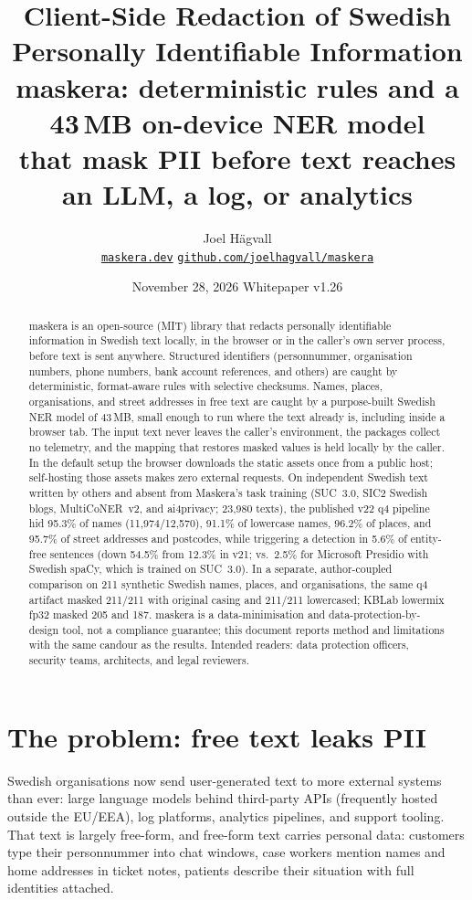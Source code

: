 \documentclass[10pt,a4paper]{article}
\title{\textbf{Client-Side Redaction of Swedish\\Personally Identifiable Information}\\[0.6em]
\large\textmd{maskera: deterministic rules and a 43\,MB on-device NER model\\that mask PII before text reaches an LLM, a log, or analytics}}
\author{Joel H\"agvall\\[0.2em]
\normalsize\href{https://maskera.dev}{\texttt{maskera.dev}} \quad
\normalsize\href{https://github.com/joelhagvall/maskera}{\texttt{github.com/joelhagvall/maskera}}}
\date{November 28, 2026 \quad\textperiodcentered\quad Whitepaper v1.26}
\begin{document}
\maketitle

\begin{abstract}
\noindent maskera is an open-source (MIT) library that redacts personally
identifiable information in Swedish text locally, in the browser or in the
caller's own server process, before text is sent anywhere. Structured identifiers (personnummer,
organisation numbers, phone numbers, bank account references, and others) are
caught by deterministic, format-aware rules with selective checksums. Names, places,
organisations, and street addresses in free text are caught by a purpose-built
Swedish NER model of 43\,MB, small enough to run where the text already is,
including inside a browser tab. The input text never leaves the caller's
environment, the packages collect no telemetry, and the mapping that restores
masked values is held locally by the caller. In the default setup the browser
downloads the static assets once from a public host; self-hosting those
assets makes zero external requests. On independent Swedish text written by
others and absent from Maskera's task training (SUC~3.0, SIC2 Swedish blogs,
MultiCoNER~v2, and ai4privacy; 23,980 texts), the published v22 q4 pipeline
hid 95.3\% of names (11,974/12,570), 91.1\% of lowercase names, 96.2\% of
places, and 95.7\% of street addresses and postcodes, while triggering a
detection in 5.6\% of entity-free sentences (down 54.5\% from 12.3\% in v21;
vs.\ 2.5\% for Microsoft Presidio with Swedish spaCy, which is trained on
SUC~3.0). In a separate, author-coupled
comparison on 211 synthetic Swedish names, places, and organisations, the same
q4 artifact masked 211/211 with original casing and 211/211 lowercased; KBLab
lowermix fp32 masked 205 and 187.
maskera is a data-minimisation and data-protection-by-design tool, not a
compliance guarantee; this document reports method and limitations with the
same candour as the results. Intended readers: data protection officers,
security teams, architects, and legal reviewers.
\end{abstract}

\section{The problem: free text leaks PII}

Swedish organisations now send user-generated text to more external systems
than ever: large language models behind third-party APIs (frequently hosted
outside the EU/EEA), log platforms, analytics pipelines, and support tooling.
That text is largely free-form, and free-form text carries personal data:
customers type their personnummer into chat windows, case workers mention
names and home addresses in ticket notes, patients describe their situation
with full identities attached.
\end{document}
